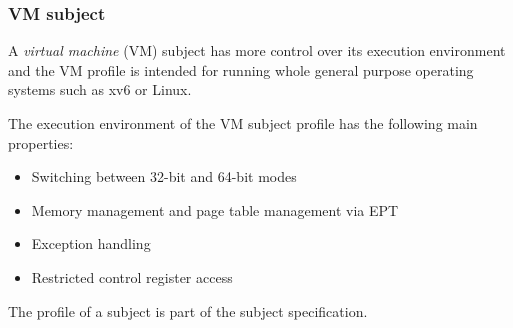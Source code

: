\subsubsection{VM subject}
A \emph{virtual machine} (VM) subject has more control over its execution
environment and the VM profile is intended for running whole general purpose
operating systems such as xv6 or Linux.

The execution environment of the VM subject profile has the following main
properties:

\begin{itemize}
	\item Switching between 32-bit and 64-bit modes
	\item Memory management and page table management via EPT
	\item Exception handling
	\item Restricted control register access
\end{itemize}

The profile of a subject is part of the subject specification.
